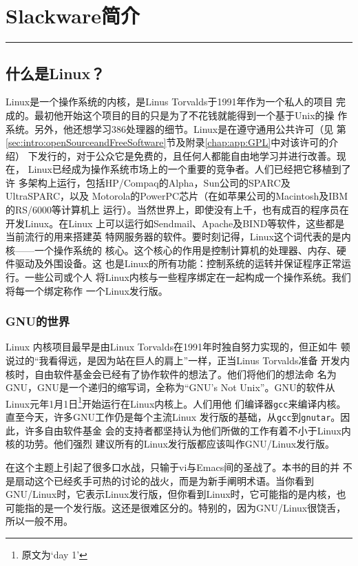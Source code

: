 
\chapter{Slackware简介}
\label{chap:introduction}

\begin{flushleft}
\rule[0mm]{\textwidth}{0.1pt}
\end{flushleft}

\section{什么是Linux？}
\label{sec:intro:whatIsLinux}
Linux是一个操作系统的内核，是Linus Torvalds于1991年作为一个私人的项目
完成的。最初他开始这个项目的目的只是为了不花钱就能得到一个基于Unix的操
作系统。另外，他还想学习386处理器的细节。Linux是在遵守通用公共许可（见
第\ref{sec:intro:openSourceandFreeSoftware}节及附录\ref{chap:app:GPL}中对该许可的介绍）
下发行的，对于公众它是免费的，且任何人都能自由地学习并进行改善。现在，
Linux已经成为操作系统市场上的一个重要的竞争者。人们已经把它移植到了许
多架构上运行，包括HP/Compaq的Alpha，Sun公司的SPARC及UltraSPARC，以及
Motorola的PowerPC芯片（在如苹果公司的Macintosh及IBM的RS/6000等计算机上
运行）。当然世界上，即使没有上千，也有成百的程序员在开发Linux。在Linux
上可以运行如Sendmail、Apache及BIND等软件，这些都是当前流行的用来搭建英
特网服务器的软件。要时刻记得，Linux这个词代表的是内核——一个操作系统的
核心。这个核心的作用是控制计算机的处理器、内存、硬件驱动及外围设备。这
也是Linux的所有功能：控制系统的运转并保证程序正常运行。一些公司或个人
将Linux内核与一些程序绑定在一起构成一个操作系统。我们将每一个绑定称作
一个Linux发行版。

\subsection{GNU的世界}
\label{sec:intro:GNU}
Linux 内核项目最早是由Linux Torvalds在1991年时独自努力实现的，但正如牛
顿说过的“我看得远，是因为站在巨人的肩上”一样，正当Linus Torvalds准备
开发内核时，自由软件基金会已经有了协作软件的想法了。他们将他们的想法命
名为GNU，GNU是一个递归的缩写词，全称为“GNU's Not Unix”。GNU的软件从
Linux元年1月1日\footnote{原文为`day 1'}开始运行在Linux内核上。人们用他
们编译器\texttt{gcc}来编译内核。直至今天，许多GNU工作仍是每个主流Linux
发行版的基础，从\texttt{gcc}到\texttt{gnutar}。因此，许多自由软件基金
会的支持者都坚持认为他们所做的工作有着不小于Linux内核的功劳。他们强烈
建议所有的Linux发行版都应该叫作GNU/Linux发行版。

在这个主题上引起了很多口水战，只输于vi与Emacs间的圣战了。本书的目的并
不是扇动这个已经炙手可热的讨论的战火，而是为新手阐明术语。当你看到
GNU/Linux时，它表示Linux发行版，但你看到Linux时，它可能指的是内核，也
可能指的是一个发行版。这还是很难区分的。特别的，因为GNU/Linux很饶舌，
所以一般不用。

